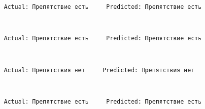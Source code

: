 \documentclass[11pt]{article}
\begin{document}
    \begin{Verbatim}[commandchars=\\\{\}]
Actual: Препятствие есть     Predicted: Препятствие есть

    \end{Verbatim}

    \begin{center}
    \end{center}
    { \hspace*{\fill} \\}
    
    \begin{Verbatim}[commandchars=\\\{\}]
Actual: Препятствие есть     Predicted: Препятствие есть

    \end{Verbatim}

    \begin{center}
    \end{center}
    { \hspace*{\fill} \\}
    
    \begin{Verbatim}[commandchars=\\\{\}]
Actual: Препятствия нет     Predicted: Препятствия нет

    \end{Verbatim}

    \begin{center}
    \end{center}
    { \hspace*{\fill} \\}
    
    \begin{Verbatim}[commandchars=\\\{\}]
Actual: Препятствие есть     Predicted: Препятствие есть

    \end{Verbatim}

    \begin{center}
    \end{center}
    { \hspace*{\fill} \\}
    
\end{document}
